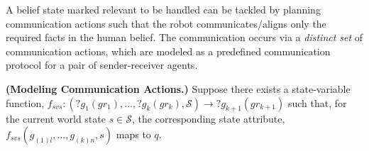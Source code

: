 \documentclass[letterpaper]{article} %
\begin{document}


A belief state marked relevant to be handled can be tackled by planning communication actions such that the robot communicates/aligns only the required facts in the human belief.
The communication occurs via a \textit{distinct set} of communication actions, which are modeled as a predefined communication protocol for a pair of sender-receiver agents.






\textbf{(Modeling Communication Actions.)} 
Suppose there exists a state-variable function, $f_{svs}:(?g_1 (gr_1), ..., ?g_k (gr_k),\mathcal{S}) \rightarrow ?g_{k+1} (gr_{k+1})$ such that,
for the current world state $s \in \mathcal{S}$, the corresponding state attribute, $f_{\textit{svs}}(g_{(1)l},...,g_{(k)n},s)$ maps to $q$.
\end{document}

